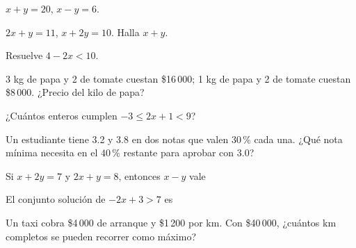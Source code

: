 \taller
{}
\begin{ejercicios}
\item $x + y = 20$, $x - y = 6$. 
\item $2x + y = 11$, $x + 2y = 10$. Halla $x + y$. 
\item Resuelve $4 - 2x < 10$. 
\end{ejercicios}
\begin{ejercicios}
\item 3 kg de papa y 2 de tomate cuestan \$16\,000; 1 kg de papa y 2 de tomate cuestan \$8\,000. ¿Precio del kilo de papa? 
\item ¿Cuántos enteros cumplen $-3 \le 2x + 1 < 9$? 
\item Un estudiante tiene 3.2 y 3.8 en dos notas que valen $30\,\%$ cada una. ¿Qué nota mínima necesita en el $40\,\%$ restante para aprobar con 3.0? 
\end{ejercicios}
\begin{ejercicios}
\item Si $x + 2y = 7$ y $2x + y = 8$, entonces $x - y$ vale
\item El conjunto solución de $-2x + 3 > 7$ es
\item Un taxi cobra \$4\,000 de arranque y \$1\,200 por km. Con \$40\,000, ¿cuántos km completos se pueden recorrer como máximo?
\end{ejercicios}

\bitacora

